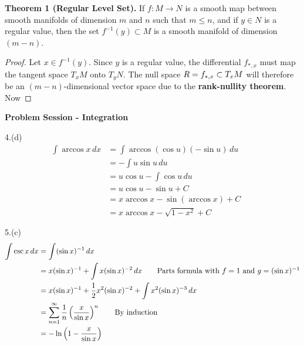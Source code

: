\documentclass[10pt]{article}
\begin{document}
\textbf{Theorem 1 (Regular Level Set).} If $f:M\to N$ is a smooth map between smooth manifolds of dimension $m$ and $n$ such that $m\leq n$, and if $y\in N$ is a regular value, then the set $f^{-1}(y)\subset M$ is a smooth manifold of dimension $(m-n)$.
\vspace{-.4cm}
\begin{proof}
Let $x\in f^{-1}(y)$. Since $y$ is a regular value, the differential $f_{*,x}$ must map the tangent space $T_xM$ onto $T_yN$. The null space $R=\null f_{*,x}\subset T_xM$ will therefore be an $(m-n)$-dimensional vector space due to the \textbf{rank-nullity theorem}. Now 
\end{proof}

\newpage
\begin{center}
\textbf{\Large Problem Session - Integration}
\end{center}
4.(d)\begin{align*}
\int\arccos x\,dx&=\int\arccos(\cos u)(-\sin u)\,du\tag*{Substitution with $x=\cos u$}\\
&=-\int u\sin u\,du\\
&=u\cos u-\int\cos u\,du&&\tag*{Parts formula with $f=u$ and $g=\cos u$}\\
&=u\cos u-\sin u+C\\
&=x\arccos x-\sin(\arccos x)+C\\
&=x\arccos x-\sqrt{1-x^2}+C
\end{align*}

5.(c)\begin{align*}
\int\csc x\,dx&=\int(\sin x)^{-1}\,dx\\
&=x(\sin x)^{-1}+\int x(\sin x)^{-2}\,dx\tag*{Parts formula with $f=1$ and $g=(\sin x)^{-1}$}\\
&=x(\sin x)^{-1}+\frac{1}{2}x^2(\sin x)^{-2}+\int x^2(\sin x)^{-3}\,dx\\
&=\sum_{n=1}^{\infty}\frac{1}{n}\left(\frac{x}{\sin x}\right)^n\tag*{By induction}\\
&=-\ln\left(1-\frac{x}{\sin x}\right)
\end{align*}
\end{document}
